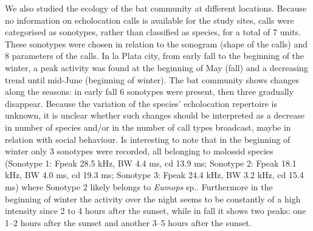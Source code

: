 {We also studied the ecology of the bat community at different locations. Because no information on echolocation calls is available for the study sites, calls were categorised as sonotypes, rather than classified as species, for a total of 7 units. These sonotypes were chosen in relation to the sonogram (shape of the calls) and 8 parameters of the calls. In la Plata city, from early fall to the beginning of the winter, a peak activity was found at the beginning of May (fall) and a decreasing trend until mid-June (beginning of winter). The bat community shows changes along the seasons: in early fall 6 sonotypes were present, then three gradually disappear. Because the variation of the species' echolocation repertoire is unknown, it is unclear whether such changes should be interpreted as a decrease in number of species and/or in the number of call types broadcast, maybe in relation with social behaviour. Is interesting to note that in the beginning of winter only 3 sonotypes were recorded, all belonging to molossid species (Sonotype 1: Fpeak 28.5 kHz, BW 4.4 ms, cd 13.9 ms; Sonotype 2: Fpeak 18.1 kHz, BW 4.0 ms, cd 19.3 ms; Sonotype 3: Fpeak 24.4 kHz, BW 3.2 kHz, cd 15.4 ms) where Sonotype 2 likely belongs to \emph{Eumops} sp.. Furthermore in the beginning of winter the activity over the night seems to be constantly of a high intensity since 2 to 4 hours after the sunset, while in fall it shows two peaks: one 1--2 hours after the sunset and another 3--5 hours after the sunset.  
} %